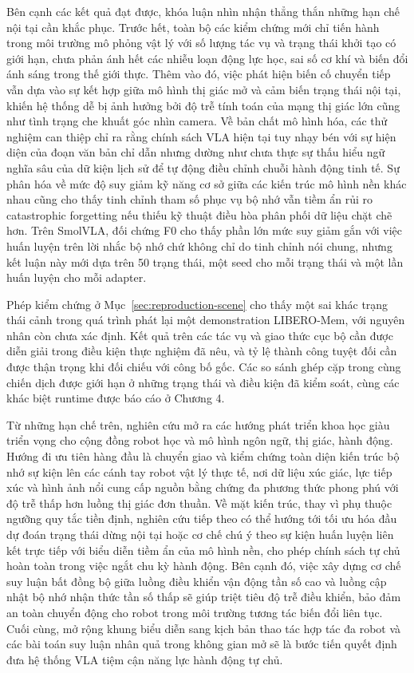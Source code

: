 Bên cạnh các kết quả đạt được, khóa luận nhìn nhận thẳng thắn những hạn chế nội tại cần khắc phục. Trước hết, toàn bộ các kiểm chứng mới chỉ tiến hành trong môi trường mô phỏng vật lý với số lượng tác vụ và trạng thái khởi tạo có giới hạn, chưa phản ánh hết các nhiễu loạn động lực học, sai số cơ khí và biến đổi ánh sáng trong thế giới thực. Thêm vào đó, việc phát hiện biến cố chuyển tiếp vẫn dựa vào sự kết hợp giữa mô hình thị giác mở và cảm biến trạng thái nội tại, khiến hệ thống dễ bị ảnh hưởng bởi độ trễ tính toán của mạng thị giác lớn cũng như tình trạng che khuất góc nhìn camera. Về bản chất mô hình hóa, các thử nghiệm can thiệp chỉ ra rằng chính sách VLA hiện tại tuy nhạy bén với sự hiện diện của đoạn văn bản chỉ dẫn nhưng dường như chưa thực sự thấu hiểu ngữ nghĩa sâu của dữ kiện lịch sử để tự động điều chỉnh chuỗi hành động tinh tế. Sự phân hóa về mức độ suy giảm kỹ năng cơ sở giữa các kiến trúc mô hình nền khác nhau cũng cho thấy tinh chỉnh tham số phục vụ bộ nhớ vẫn tiềm ẩn rủi ro catastrophic forgetting nếu thiếu kỹ thuật điều hòa phân phối dữ liệu chặt chẽ hơn. Trên SmolVLA, đối chứng F0 cho thấy phần lớn mức suy giảm gắn với việc huấn luyện trên lời nhắc bộ nhớ chứ không chỉ do tinh chỉnh nói chung, nhưng kết luận này mới dựa trên 50 trạng thái, một seed cho mỗi trạng thái và một lần huấn luyện cho mỗi adapter.

Phép kiểm chứng ở Mục~\ref{sec:reproduction-scene} cho thấy một sai khác trạng thái cảnh trong quá trình phát lại một demonstration LIBERO-Mem, với nguyên nhân còn chưa xác định. Kết quả trên các tác vụ và giao thức cục bộ cần được diễn giải trong điều kiện thực nghiệm đã nêu, và tỷ lệ thành công tuyệt đối cần được thận trọng khi đối chiếu với công bố gốc. Các so sánh ghép cặp trong cùng chiến dịch được giới hạn ở những trạng thái và điều kiện đã kiểm soát, cùng các khác biệt runtime được báo cáo ở Chương 4.

Từ những hạn chế trên, nghiên cứu mở ra các hướng phát triển khoa học giàu triển vọng cho cộng đồng robot học và mô hình ngôn ngữ, thị giác, hành động. Hướng đi ưu tiên hàng đầu là chuyển giao và kiểm chứng toàn diện kiến trúc bộ nhớ sự kiện lên các cánh tay robot vật lý thực tế, nơi dữ liệu xúc giác, lực tiếp xúc và hình ảnh nổi cung cấp nguồn bằng chứng đa phương thức phong phú với độ trễ thấp hơn luồng thị giác đơn thuần. Về mặt kiến trúc, thay vì phụ thuộc ngưỡng quy tắc tiền định, nghiên cứu tiếp theo có thể hướng tới tối ưu hóa đầu dự đoán trạng thái dừng nội tại hoặc cơ chế chú ý theo sự kiện huấn luyện liên kết trực tiếp với biểu diễn tiềm ẩn của mô hình nền, cho phép chính sách tự chủ hoàn toàn trong việc ngắt chu kỳ hành động. Bên cạnh đó, việc xây dựng cơ chế suy luận bất đồng bộ giữa luồng điều khiển vận động tần số cao và luồng cập nhật bộ nhớ nhận thức tần số thấp sẽ giúp triệt tiêu độ trễ điều khiển, bảo đảm an toàn chuyển động cho robot trong môi trường tương tác biến đổi liên tục. Cuối cùng, mở rộng khung biểu diễn sang kịch bản thao tác hợp tác đa robot và các bài toán suy luận nhân quả trong không gian mở sẽ là bước tiến quyết định đưa hệ thống VLA tiệm cận năng lực hành động tự chủ.
